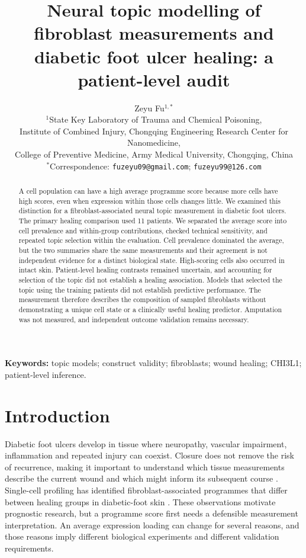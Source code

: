 \documentclass[10pt,a4paper]{article}
\title{Neural topic modelling of fibroblast measurements and diabetic foot ulcer healing: a patient-level audit}
\author{Zeyu Fu$^{1,*}$\\[3pt]\small $^1$State Key Laboratory of Trauma and Chemical Poisoning,\\\small Institute of Combined Injury, Chongqing Engineering Research Center for Nanomedicine,\\\small College of Preventive Medicine, Army Medical University, Chongqing, China\\\small $^*$Correspondence: \texttt{fuzeyu09@gmail.com}; \texttt{fuzeyu99@126.com}}\date{}
\begin{document}
\maketitle
\modulolinenumbers[5]\linenumbers
\begin{abstract}
A cell population can have a high average programme score because more cells have high scores, even when expression within those cells changes little. We examined this distinction for a fibroblast-associated neural topic measurement in diabetic foot ulcers. The primary healing comparison used 11 patients. We separated the average score into cell prevalence and within-group contributions, checked technical sensitivity, and repeated topic selection within the evaluation. Cell prevalence dominated the average, but the two summaries share the same measurements and their agreement is not independent evidence for a distinct biological state. High-scoring cells also occurred in intact skin. Patient-level healing contrasts remained uncertain, and accounting for selection of the topic did not establish a healing association. Models that selected the topic using the training patients did not establish predictive performance. The measurement therefore describes the composition of sampled fibroblasts without demonstrating a unique cell state or a clinically useful healing predictor. Amputation was not measured, and independent outcome validation remains necessary.
\end{abstract}
\noindent\textbf{Keywords:} topic models; construct validity; fibroblasts; wound healing; CHI3L1; patient-level inference.

\section{Introduction}
Diabetic foot ulcers develop in tissue where neuropathy, vascular impairment, inflammation and repeated injury can coexist. Closure does not remove the risk of recurrence, making it important to understand which tissue measurements describe the current wound and which might inform its subsequent course \citep{armstrong2017,wilkinson2020}. Single-cell profiling has identified fibroblast-associated programmes that differ between healing groups in diabetic-foot skin \citep{theocharidis2022,geo_gse165816}. These observations motivate prognostic research, but a programme score first needs a defensible measurement interpretation. An average expression loading can change for several reasons, and those reasons imply different biological experiments and different validation requirements.
\end{document}
